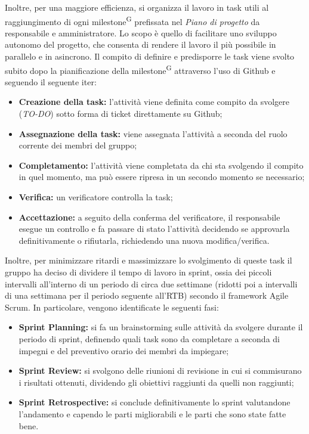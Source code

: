 Inoltre, per una maggiore efficienza, si organizza il lavoro in task utili al raggiungimento di ogni milestone\textsuperscript{G} prefissata nel \textit{Piano di progetto} da responsabile e amministratore. %
Lo scopo è quello di facilitare uno sviluppo autonomo del progetto, che consenta di rendere il lavoro il più possibile in parallelo e in asincrono.
Il compito di definire e predisporre le task viene svolto subito dopo la pianificazione della milestone\textsuperscript{G} attraverso l'uso di Github e seguendo il seguente iter:
\begin{itemize}
    \item \textbf{Creazione della task:} l'attività viene definita come compito da svolgere (\textit{TO-DO}) sotto forma di ticket direttamente su Github;
    \item \textbf{Assegnazione della task:} viene assegnata l'attività a seconda del ruolo corrente dei membri del gruppo;
    \item \textbf{Completamento:} l'attività viene completata da chi sta svolgendo il compito in quel momento, ma può essere ripresa in un secondo momento se necessario;
    \item \textbf{Verifica:} un verificatore controlla la task;
    \item \textbf{Accettazione:} a seguito della conferma del verificatore, il responsabile esegue un controllo e fa passare di stato l'attività decidendo se approvarla definitivamente o rifiutarla, richiedendo una nuova modifica/verifica.
\end{itemize}
Inoltre, per minimizzare ritardi e massimizzare lo svolgimento di queste task il gruppo ha deciso di dividere il tempo di lavoro in sprint, ossia dei piccoli intervalli all'interno di un periodo di circa due settimane (ridotti poi a intervalli di una settimana per il periodo seguente all'RTB) secondo il framework Agile Scrum.
In particolare, vengono identificate le seguenti fasi:
\begin{itemize}
    \item \textbf{Sprint Planning:} si fa un brainstorming sulle attività da svolgere durante il periodo di sprint, definendo quali task sono da completare a seconda di impegni e del preventivo orario dei membri da impiegare;
    \item \textbf{Sprint Review:} si svolgono delle riunioni di revisione in cui si commisurano i risultati ottenuti, dividendo gli obiettivi raggiunti da quelli non raggiunti;
    \item \textbf{Sprint Retrospective:} si conclude definitivamente lo sprint valutandone l'andamento e capendo le parti migliorabili e le parti che sono state fatte bene.
\end{itemize}

